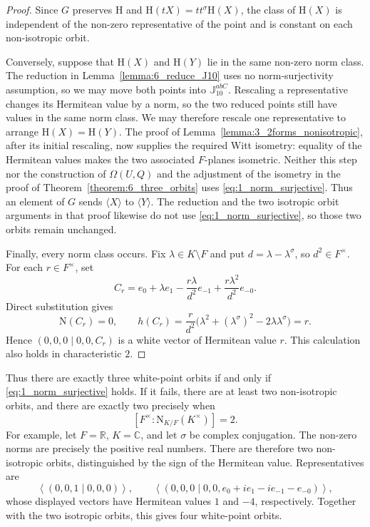\documentclass{amsart}
\def\NN{\mathord{\mathrm{N}}}
\newcommand{\J}{\mathbb{J}}
\renewcommand{\H}{\mathrm{H}}
\newcommand{\s}{\sigma}
\theoremstyle{plain}
\numberwithin{theorem}{section}
\theoremstyle{definition}
\begin{document}
\begin{proof}
    Since $G$ preserves $\H$ and $\H(tX)=tt^\s\H(X)$, the class of
    $\H(X)$ is independent of the non-zero representative of the point
    and is constant on each non-isotropic orbit.

    Conversely, suppose that $\H(X)$ and $\H(Y)$ lie in the same
    non-zero norm class. The reduction in
    Lemma~\ref{lemma:6_reduce_J10} uses no norm-surjectivity assumption,
    so we may move both points into $\J_{10}^{abC}$.
    Rescaling a representative changes its Hermitean value by a norm,
    so the two reduced points still have values in the same norm class.
    We may therefore rescale one representative to arrange
    $\H(X)=\H(Y)$. The proof of
    Lemma~\ref{lemma:3_2forms_nonisotropic}, after its initial rescaling,
    now supplies the required Witt isometry: equality of the Hermitean
    values makes the two associated $F$-planes isometric.
    Neither this step nor the construction of $\Omega(U,Q)$ and the
    adjustment of the isometry in the proof of
    Theorem~\ref{theorem:6_three_orbits} uses
    \eqref{eq:1_norm_surjective}. Thus an element of $G$ sends
    $\langle X\rangle$ to $\langle Y\rangle$.
    The reduction and the two isotropic orbit arguments in that proof
    likewise do not use \eqref{eq:1_norm_surjective}, so those two
    orbits remain unchanged.

    Finally, every norm class occurs. Fix $\lambda\in K\setminus F$
    and put $d=\lambda-\lambda^\s$, so $d^2\in F^\times$.
    For each $r\in F^\times$, set
    \[
        C_r=e_0+\lambda e_1-\frac{r\lambda}{d^2}e_{-1}
                         +\frac{r\lambda^2}{d^2}e_{-0}.
    \]
    Direct substitution gives
    \[
        \NN(C_r)=0,\qquad
        h(C_r)=\frac{r}{d^2}
          \bigl(\lambda^2+(\lambda^\s)^2-2\lambda\lambda^\s\bigr)=r.
    \]
    Hence $(0,0,0\mid0,0,C_r)$ is a white vector of Hermitean value $r$.
    This calculation also holds in characteristic $2$.
\end{proof}

Thus there are exactly three white-point orbits if and only if
\eqref{eq:1_norm_surjective} holds. If it fails, there are at least two
non-isotropic orbits, and there are exactly two precisely when
\[
    [F^\times:\NN_{K/F}(K^\times)]=2.
\]
For example, let $F=\mathbb R$, $K=\mathbb C$, and let $\s$ be complex
conjugation. The non-zero norms are precisely the positive real numbers.
There are therefore two non-isotropic orbits, distinguished by the sign
of the Hermitean value. Representatives are
\[
    \left\langle(0,0,1\mid0,0,0)\right\rangle,\qquad
    \left\langle(0,0,0\mid0,0,e_0+i e_1-i e_{-1}-e_{-0})\right\rangle,
\]
whose displayed vectors have Hermitean values $1$ and $-4$,
respectively. Together with the two isotropic orbits, this gives
four white-point orbits.
\end{document}
